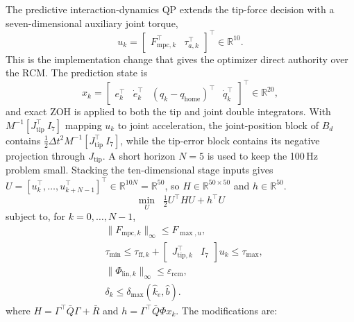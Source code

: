 The predictive interaction-dynamics QP extends the tip-force decision with a seven-dimensional auxiliary joint torque,
\begin{equation}
u_k=\begin{bmatrix}F_{\text{mpc},k}^\top&\tau_{a,k}^\top\end{bmatrix}^\top\in\mathbb{R}^{10}.
\label{eq:combinedinput}
\end{equation}
This is the implementation change that gives the optimizer direct authority over the RCM. The prediction state is
\begin{equation}
x_k=\begin{bmatrix}e_k^\top&\dot e_k^\top&(q_k-q_{\text{home}})^\top&\dot q_k^\top\end{bmatrix}^\top\in\mathbb{R}^{20},
\end{equation}
and exact ZOH is applied to both the tip and joint double integrators. With $M^{-1}[J_{\text{tip}}^\top\ I_7]$ mapping $u_k$ to joint acceleration, the joint-position block of $B_d$ contains $\frac12\Delta t^2M^{-1}[J_{\text{tip}}^\top\ I_7]$, while the tip-error block contains its negative projection through $J_{\text{tip}}$. A short horizon $N=5$ is used to keep the 100\,Hz problem small. Stacking the ten-dimensional stage inputs gives $U=[u_k^\top,\ldots,u_{k+N-1}^\top]^\top\in\mathbb{R}^{10N}=\mathbb{R}^{50}$, so $H\in\mathbb{R}^{50\times50}$ and $h\in\mathbb{R}^{50}$.
\begin{equation}
\min_U \;\; \tfrac{1}{2} U^\top H U + h^\top U
\label{eq:qpcost}
\end{equation}
subject to, for $k=0,\dots,N-1$,
\begin{subequations}
\begin{align}
&\|F_{\text{mpc},k}\|_\infty\le F_{\max,u}, \label{eq:effort_con}\\
&\tau_{\min}\le\tau_{\text{ff},k}+
\begin{bmatrix}J_{\text{tip},k}^\top&I_7\end{bmatrix}u_k
\le\tau_{\max}, \label{eq:torque_con}\\
&\|\Phi_{\text{lin},k}\|_\infty\le\varepsilon_{\text{rcm}}, \label{eq:rcm_con}\\
&\delta_k\le\delta_{\max}(\hat k_e,\hat b). \label{eq:force_con}
\end{align}
\end{subequations}
where $H=\Gamma^\top\bar Q\Gamma+\bar R$ and $h=\Gamma^\top\bar Q\Phi x_k$. The modifications are:


